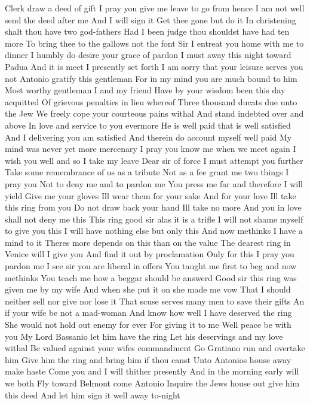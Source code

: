 Clerk draw a deed of gift
I pray you give me leave to go from hence
I am not well send the deed after me
And I will sign it
Get thee gone but do it
In christening shalt thou have two god-fathers
Had I been judge thou shouldst have had ten more
To bring thee to the gallows not the font
Sir I entreat you home with me to dinner
I humbly do desire your grace of pardon
I must away this night toward Padua
And it is meet I presently set forth
I am sorry that your leisure serves you not
Antonio gratify this gentleman
For in my mind you are much bound to him
Most worthy gentleman I and my friend
Have by your wisdom been this day acquitted
Of grievous penalties in lieu whereof
Three thousand ducats due unto the Jew
We freely cope your courteous pains withal
And stand indebted over and above
In love and service to you evermore
He is well paid that is well satisfied
And I delivering you am satisfied
And therein do account myself well paid
My mind was never yet more mercenary
I pray you know me when we meet again
I wish you well and so I take my leave
Dear sir of force I must attempt you further
Take some remembrance of us as a tribute
Not as a fee grant me two things I pray you
Not to deny me and to pardon me
You press me far and therefore I will yield
Give me your gloves Ill wear them for your sake
And for your love Ill take this ring from you
Do not draw back your hand Ill take no more
And you in love shall not deny me this
This ring good sir alas it is a trifle
I will not shame myself to give you this
I will have nothing else but only this
And now methinks I have a mind to it
Theres more depends on this than on the value
The dearest ring in Venice will I give you
And find it out by proclamation
Only for this I pray you pardon me
I see sir you are liberal in offers
You taught me first to beg and now methinks
You teach me how a beggar should be answerd
Good sir this ring was given me by my wife
And when she put it on she made me vow
That I should neither sell nor give nor lose it
That scuse serves many men to save their gifts
An if your wife be not a mad-woman
And know how well I have deserved the ring
She would not hold out enemy for ever
For giving it to me Well peace be with you
My Lord Bassanio let him have the ring
Let his deservings and my love withal
Be valued against your wifes commandment
Go Gratiano run and overtake him
Give him the ring and bring him if thou canst
Unto Antonios house away make haste
Come you and I will thither presently
And in the morning early will we both
Fly toward Belmont come Antonio
Inquire the Jews house out give him this deed
And let him sign it well away to-night
